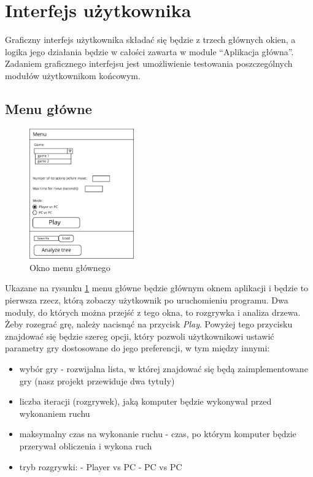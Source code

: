 \documentclass{article}
\let\oldsection\section
\renewcommand\section{\clearpage\oldsection}
\begin{document}
	\section{Interfejs użytkownika}
	Graficzny interfejs użytkownika składać się będzie z trzech głównych okien, a logika jego działania będzie w całości zawarta w module ``Aplikacja główna''. Zadaniem graficznego interfejsu jest umożliwienie testowania poszczególnych modułów użytkownikom końcowym.
	
	\subsection{Menu główne}
	\begin{figure}[h!]
		\centering
		\includegraphics[width=0.4\textwidth]{menu-eps}
		\caption{Okno menu głównego}
		\label{rys:main_menu}
	\end{figure}

	\noindent Ukazane na rysunku \ref{rys:main_menu} menu główne będzie głównym oknem aplikacji i będzie to pierwsza rzecz, którą zobaczy użytkownik po uruchomieniu programu. Dwa moduły, do których można przejść z tego okna, to rozgrywka i analiza drzewa.	Żeby rozegrać grę, należy nacisnąć na przycisk \textit{Play}. Powyżej tego przycisku znajdować się będzie szereg opcji, który pozwoli użytkownikowi ustawić parametry gry dostosowane do jego preferencji, w tym między innymi:\\
	
	\begin{itemize}
		\item wybór gry - rozwijalna lista, w której znajdować się będą zaimplementowane gry (nasz projekt przewiduje dwa tytuły)
		\item liczba iteracji (rozgrywek), jaką komputer będzie wykonywał przed wykonaniem ruchu
		\item maksymalny czas na wykonanie ruchu - czas, po którym komputer będzie przerywał obliczenia i wykona ruch
		\item tryb rozgrywki:
		\subitem - Player vs PC
		\subitem - PC vs PC\\
	\end{itemize}
\end{document}
